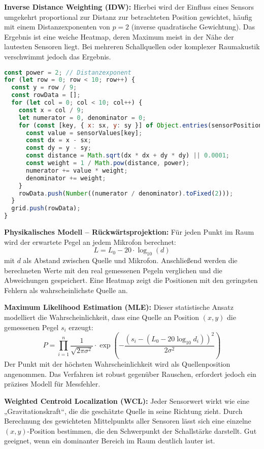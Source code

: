 \textbf{Inverse Distance Weighting (IDW):}  
Hierbei wird der Einfluss eines Sensors umgekehrt proportional zur Distanz zur betrachteten Position gewichtet, häufig mit einem Distanzexponenten von $p=2$ (inverse quadratische Gewichtung). Das Ergebnis ist eine weiche Heatmap, deren Maximum meist in der Nähe der lautesten Sensoren liegt. Bei mehreren Schallquellen oder komplexer Raumakustik verschwimmt jedoch das Ergebnis.
\begin{lstlisting}[language=JavaScript, caption={Inverse Distance Weighting}]
const power = 2; // Distanzexponent
for (let row = 0; row < 10; row++) {
  const y = row / 9;
  const rowData = [];
  for (let col = 0; col < 10; col++) {
    const x = col / 9;
    let numerator = 0, denominator = 0;
    for (const [key, { x: sx, y: sy }] of Object.entries(sensorPositions)) {
      const value = sensorValues[key];
      const dx = x - sx;
      const dy = y - sy;
      const distance = Math.sqrt(dx * dx + dy * dy) || 0.0001;
      const weight = 1 / Math.pow(distance, power);
      numerator += value * weight;
      denominator += weight;
    }
    rowData.push(Number((numerator / denominator).toFixed(2)));
  }
  grid.push(rowData);
}
\end{lstlisting}

\textbf{Physikalisches Modell – Rückwärtsprojektion:}  
Für jeden Punkt im Raum wird der erwartete Pegel an jedem Mikrofon berechnet:
\[
L = L_0 - 20 \cdot \log_{10}(d)
\]
mit $d$ als Abstand zwischen Quelle und Mikrofon. Anschließend werden die berechneten Werte mit den real gemessenen Pegeln verglichen und die Abweichungen gespeichert. Eine Heatmap zeigt die Positionen mit den geringsten Fehlern als wahrscheinlichste Quelle an.

\textbf{Maximum Likelihood Estimation (MLE):}  
Dieser statistische Ansatz modelliert die Wahrscheinlichkeit, dass eine Quelle an Position $(x, y)$ die gemessenen Pegel $s_i$ erzeugt:
\[
P = \prod_{i=1}^{n} \frac{1}{\sqrt{2\pi\sigma^2}} \cdot
\exp\left(-\frac{(s_i - (L_0 - 20\log_{10} d_i))^2}{2\sigma^2}\right)
\]
Der Punkt mit der höchsten Wahrscheinlichkeit wird als Quellenposition angenommen. Das Verfahren ist robust gegenüber Rauschen, erfordert jedoch ein präzises Modell für Messfehler.

\textbf{Weighted Centroid Localization (WCL):}  
Jeder Sensorwert wirkt wie eine „Gravitationskraft“, die die geschätzte Quelle in seine Richtung zieht. Durch Berechnung des gewichteten Mittelpunkts aller Sensoren lässt sich eine einzelne $(x,y)$-Position bestimmen, die den Schwerpunkt der Schallstärke darstellt. Gut geeignet, wenn ein dominanter Bereich im Raum deutlich lauter ist.

